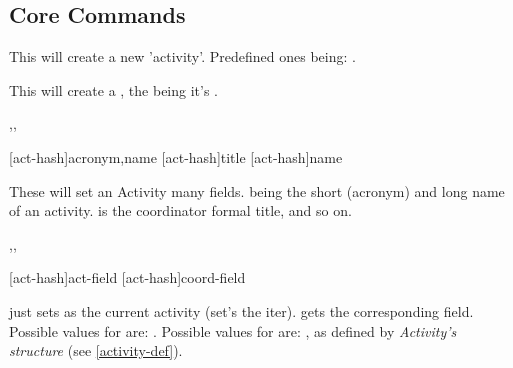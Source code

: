 \documentclass[article,nofontwarning,nogeometry,english,tocdepth=3,secdepth=3]{ufrgscca} %
\begin{document}
\label{student-def}



\subsection{Core Commands}\label{core-commands}



\begin{codedescribe}[code,new=2023/11/18]{\NewActivity}
	\begin{codesyntax}%
	\end{codesyntax}
This will create a new 'activity'. Predefined ones being: .
\end{codedescribe}
\begin{tsremark}
This will create a , the  being it's .
\end{tsremark}



\begin{codedescribe}[code,new=2023/11/18]{\ActivitySet,\ActivitySetCoordTitle,\ActivitySetCoord}
	\begin{codesyntax}%
    \tsmacro{\ActivitySet}[act-hash]{acronym,name}
    \tsmacro{\ActivitySetCoordTitle}[act-hash]{title}
    \tsmacro{\ActivitySetCoord}[act-hash]{name}
	\end{codesyntax}
These will set an Activity many fields.  being the short (acronym) and long name of an activity.  is the coordinator formal title, and so on.
\end{codedescribe}



\begin{codedescribe}[code,new=2023/11/18]{\ActivitySelect,\Activity,\ActivityCoord}
	\begin{codesyntax}%
    \tsmacro{\Activity}[act-hash]{act-field}
    \tsmacro{\ActivityCoord}[act-hash]{coord-field}
	\end{codesyntax}
\tsobj{\ActivitySelect} just sets  as the current activity (set's the  iter). \tsobj{\Activity,\ActivityCoord} gets the corresponding field.
Possible values for  are: .
Possible values for  are: , as defined by \emph{Activity's structure} (see \ref{activity-def}).

\end{codedescribe}
\end{document}
